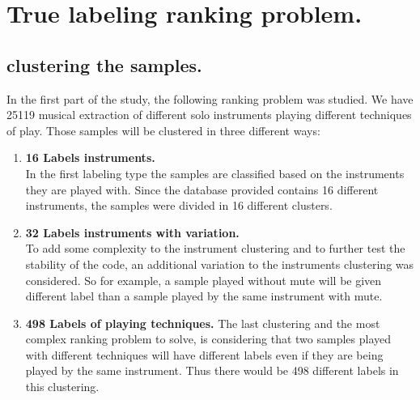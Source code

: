 \documentclass[hidelinks,12pt]{report}
\begin{document}
\chapter{True labeling ranking problem.}
\section{clustering the samples.}
In the first part of the study, the following ranking problem was studied. We have 25119 musical extraction of different solo instruments playing different techniques of play. Those samples will be clustered in three different ways: 
\begin{enumerate}
\item \textbf{ 16 Labels instruments.}\\
In the first labeling type the samples are classified based on the instruments they are played with. Since the database provided contains 16 different instruments, the samples were divided in 16 different clusters.
\item \textbf{32 Labels instruments with variation.}\\
To add some complexity to the instrument clustering and to further test the stability of the code, an additional variation to the instruments clustering was considered. So for example, a sample played without mute will be given different label than a sample played by the same instrument with mute.
\item \textbf{498 Labels of playing techniques.}
The last clustering and the most complex ranking problem to solve, is considering that two samples played with different techniques will have different labels even if they are being played by the same instrument. Thus there would be 498 different labels in this clustering.\\

\end{enumerate}
\end{document}
